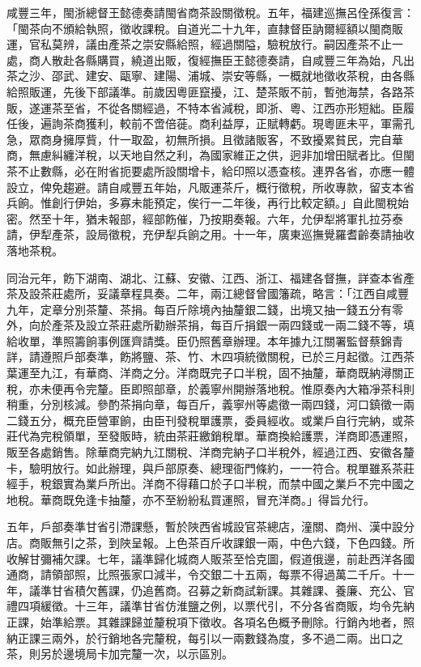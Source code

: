 \begin{pinyinscope}
咸豐三年，閩浙總督王懿德奏請閩省商茶設關徵稅。五年，福建巡撫呂佺孫復言：「閩茶向不頒給執照，徵收課稅。自道光二十九年，直隸督臣訥爾經額以閩商販運，官私莫辨，議由產茶之崇安縣給照，經過關隘，驗稅放行。嗣因產茶不止一處，商人散赴各縣購買，繞道出販，復經撫臣王懿德奏請，自咸豐三年為始，凡出茶之沙、邵武、建安、甌寧、建陽、浦城、崇安等縣，一概就地徵收茶稅，由各縣給照販運，先後下部議準。前歲因粵匪竄擾，江、楚茶販不前，暫弛海禁，各路茶販，遂運茶至省，不從各關經過，不特本省減稅，即浙、粵、江西亦形短絀。臣履任後，遍詢茶商獲利，較前不啻倍蓰。商利益厚，正賦轉虧。現粵匪未平，軍需孔急，眾商身擁厚貲，什一取盈，初無所損。且徵諸販客，不致擾累貧民，完自華商，無慮糾纏洋稅，以天地自然之利，為國家維正之供，迥非加增田賦者比。但閩茶不止數縣，必在附省扼要處所設關增卡，給印照以憑查核。連界各省，亦應一體設立，俾免趨避。請自咸豐五年始，凡販運茶斤，概行徵稅，所收專款，留支本省兵餉。惟創行伊始，多寡未能預定，俟行一二年後，再行比較定額。」自此閩稅始密。然至十年，猶未報部，經部飭催，乃按期奏報。六年，允伊犁將軍扎拉芬泰請，伊犁產茶，設局徵稅，充伊犁兵餉之用。十一年，廣東巡撫覺羅耆齡奏請抽收落地茶稅。

同治元年，飭下湖南、湖北、江蘇、安徽、江西、浙江、福建各督撫，詳查本省產茶及設茶莊處所，妥議章程具奏。二年，兩江總督曾國籓疏，略言：「江西自咸豐九年，定章分別茶釐、茶捐。每百斤除境內抽釐銀二錢，出境又抽一錢五分有零外，向於產茶及設立茶莊處所勸辦茶捐，每百斤捐銀一兩四錢或一兩二錢不等，填給收單，準照籌餉事例匯齊請獎。臣仍照舊章辦理。本年據九江關署監督蔡錦青詳，請遵照戶部奏準，飭將鹽、茶、竹、木四項統徵關稅，已於三月起徵。江西茶葉運至九江，有華商、洋商之分。洋商既完子口半稅，固不抽釐，華商既納潯關正稅，亦未便再令完釐。臣即照部章，於義寧州開辦落地稅。惟原奏內大箱凈茶科則稍重，分別核減。參酌茶捐向章，每百斤，義寧州等處徵一兩四錢，河口鎮徵一兩二錢五分，概充臣營軍餉，由臣刊發稅單護票，委員經收。或業戶自行完納，或茶莊代為完稅領單，至發販時，統由茶莊繳銷稅單。華商換給護票，洋商即憑運照，販至各處銷售。除華商完納九江關稅、洋商完納子口半稅外，經過江西、安徽各釐卡，驗明放行。如此辦理，與戶部原奏、總理衙門條約，一一符合。稅單雖系茶莊經手，稅銀實為業戶所出。洋商不得藉口於子口半稅，而禁中國之業戶不完中國之地稅。華商既免逢卡抽釐，亦不至紛紛私買運照，冒充洋商。」得旨允行。

五年，戶部奏準甘省引滯課懸，暫於陜西省城設官茶總店，潼關、商州、漢中設分店。商販無引之茶，到陜呈報。上色茶百斤收課銀一兩，中色六錢，下色四錢。所收解甘彌補欠課。七年，議準歸化城商人販茶至恰克圖，假道俄邊，前赴西洋各國通商，請領部照，比照張家口減半，令交銀二十五兩，每票不得過萬二千斤。十一年，議準甘省積欠舊課，仍追舊商。召募之新商試新課。其雜課、養廉、充公、官禮四項緩徵。十三年，議準甘省仿淮鹽之例，以票代引，不分各省商販，均令先納正課，始準給票。其雜課歸並釐稅項下徵收。各項名色概予刪除。行銷內地者，照納正課三兩外，於行銷地各完釐稅，每引以一兩數錢為度，多不過二兩。出口之茶，則另於邊境局卡加完釐一次，以示區別。


\end{pinyinscope}
